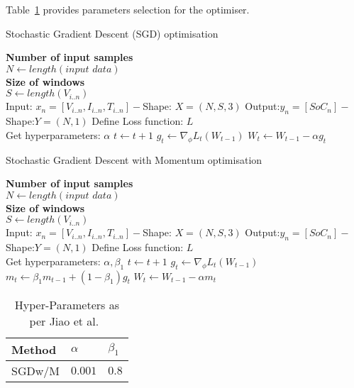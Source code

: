 %
%
Table~\ref{tab:params-jiao} provides parameters selection for the optimiser.
\begin{algorithm}
  \caption{Stochastic Gradient Descent (SGD) optimisation}
  \begin{algorithmic}[1]
    \STATE \textbf{Number of input samples} \\ $N\gets length(\textit{input data})$\\
    \STATE \textbf{Size of windows} \\ $S\gets length(V_{i..n})$\\
    \STATE Input: $x_n = [V_{i..n}, I_{i..n}, T_{i..n}] - $Shape: $X = (N, S, 3)$
    \STATE Output:$y_n = [SoC_{n}] - $Shape:$Y = (N, 1)$
    \STATE Define Loss function: $L$ \\
           Get hyperparameters: $\alpha$
    \STATE $t \gets t+1$
    \STATE $g_t \gets \nabla_\phi L_t (W_{t-1})$ 
    \STATE $W_t \gets W_{t-1} - \alpha g_t $ 
    \ENDWHILE
  \end{algorithmic}
  \label{alg:SGD}
\end{algorithm}
\begin{algorithm}
  \caption{Stochastic Gradient Descent with Momentum optimisation}
  \begin{algorithmic}[1]
    \STATE \textbf{Number of input samples} \\ $N\gets length(\textit{input data})$\\
    \STATE \textbf{Size of windows} \\ $S\gets length(V_{i..n})$\\
    \STATE Input: $x_n = [V_{i..n}, I_{i..n}, T_{i..n}] - $Shape: $X = (N, S, 3)$
    \STATE Output:$y_n = [SoC_{n}] - $Shape:$Y = (N, 1)$
    \STATE Define Loss function: $L$ \\
           Get hyperparameters: $\alpha, \beta_1$
    \STATE $t \gets t+1$
    \STATE $g_t \gets \nabla_\phi L_t (W_{t-1})$ 
    \STATE $m_t \gets \beta_1 m_{t-1}+(1-\beta_1) g_t $ 
    \STATE $W_t \gets W_{t-1} - \alpha m_t $  
    \ENDWHILE
  \end{algorithmic}
  \label{alg:SGDwM}
\end{algorithm}
\begin{table}[ht]
    \centering
    \caption{Hyper-Parameters as per Jiao et al.~\cite{jiao_gru-rnn_2020}}
    \label{tab:params-jiao}
    \begin{tabular}{ p{6.0cm} p{1.5cm} p{1.5cm}   }
        \hline
        Method     & $\alpha$ & $\beta_1 $  \\
        \hline
        SGDw/M
                & $0.001$ & $0.8$  \\%
        \hline
    \end{tabular}
\end{table}
